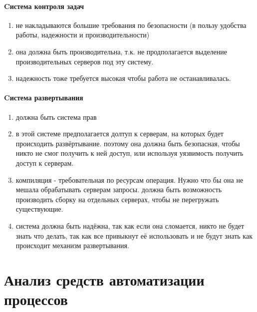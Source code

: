 \documentclass{article}
\begin{document}
\paragraph{Cистема контроля задач}
\begin{enumerate}
    \item{не накладываются большие требования по безопасности (в пользу удобства работы, надежности и производительности)}
    \item{она должна быть производительна, т.к. не продполагается выделение производительных серверов под эту систему.}
    \item{надежность тоже требуется высокая чтобы работа не останавливалась.}
\end{enumerate}

\paragraph{Cистема развертывания}
\begin{enumerate}  
    \item{должна быть система прав}
   
    \item{в этой системе предполагается долтуп к серверам, на которых будет происходить развёртывание.
    поэтому она должна быть безопасная, чтобы никто не смог получить к ней доступ, или используя уязвимость
    получить доступ к серверам.}
   
    \item{компиляция - требовательная по ресурсам операция. Нужно что бы она не мешала обрабатывать серверам запросы.
    должна быть возможность производить сборку на отдельных серверах, чтобы не перегружать существующие.}
   
    \item{система должна быть надёжна, так как если она сломается, никто не будет знать что делать, так как все привыкнут
    её использовать и не будут знать как происходит механизм развертывания.}
\end{enumerate}   

\pagebreak


\section{Анализ средств автоматизации процессов}
\end{document}
